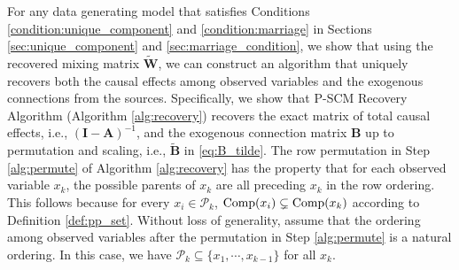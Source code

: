 \documentclass[12pt]{article}
\newcommand{\bA}{\mathbf{A}}
\newcommand{\bB}{\mathbf{B}}
\newcommand{\bW}{\mathbf{W}}
\newcommand{\bI}{\mathbf{I}}
\begin{document}

For any data generating model that satisfies Conditions \ref{condition:unique_component} and \ref{condition:marriage} in Sections \ref{sec:unique_component} and \ref{sec:marriage_condition}, we show that using the recovered mixing matrix $\tilde{\bW}$, we can construct an algorithm that uniquely recovers both the causal effects among observed variables and the exogenous connections from the sources. Specifically, we show that P-SCM Recovery Algorithm (Algorithm \ref{alg:recovery}) recovers the exact matrix of total causal effects, i.e., $(\bI-\bA)^{-1}$, and the exogenous connection matrix $\bB$ up to permutation and scaling, i.e., $\tilde{\bB}$ in \eqref{eq:B_tilde}. The row permutation in Step \ref{alg:permute} of Algorithm \ref{alg:recovery} has the property that for each observed variable $x_k$, the possible parents of $x_k$ are all preceding $x_k$ in the row ordering. This follows because for every $x_i\in\mathcal{P}_k$, ${\rm{Comp}}(x_i)\subsetneq{\rm{Comp}}(x_k)$ according to Definition \ref{def:pp_set}. Without loss of generality, assume that the ordering among observed variables after the permutation in Step \ref{alg:permute} is a natural ordering. In this case, we have $\mathcal{P}_k\subseteq \{x_1,\cdots,x_{k-1}\}$ for all $x_k$.
\end{document}

